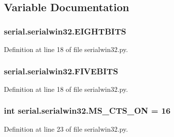 \subsection{Variable Documentation}
\subsubsection[{\texorpdfstring{E\+I\+G\+H\+T\+B\+I\+TS}{EIGHTBITS}}]{\setlength{\rightskip}{0pt plus 5cm}serial.\+serialwin32.\+E\+I\+G\+H\+T\+B\+I\+TS}\hypertarget{namespaceserial_1_1serialwin32_af3a8a7578cf39e9b26901a2341af2ec8}{}\label{namespaceserial_1_1serialwin32_af3a8a7578cf39e9b26901a2341af2ec8}


Definition at line 18 of file serialwin32.\+py.

\subsubsection[{\texorpdfstring{F\+I\+V\+E\+B\+I\+TS}{FIVEBITS}}]{\setlength{\rightskip}{0pt plus 5cm}serial.\+serialwin32.\+F\+I\+V\+E\+B\+I\+TS}\hypertarget{namespaceserial_1_1serialwin32_af6d7987bfd20cc697d5e3e6962be62bd}{}\label{namespaceserial_1_1serialwin32_af6d7987bfd20cc697d5e3e6962be62bd}


Definition at line 18 of file serialwin32.\+py.

\subsubsection[{\texorpdfstring{M\+S\+\_\+\+C\+T\+S\+\_\+\+ON}{MS_CTS_ON}}]{\setlength{\rightskip}{0pt plus 5cm}int serial.\+serialwin32.\+M\+S\+\_\+\+C\+T\+S\+\_\+\+ON = 16}\hypertarget{namespaceserial_1_1serialwin32_a95299fa794686b635febcf3066482fa5}{}\label{namespaceserial_1_1serialwin32_a95299fa794686b635febcf3066482fa5}


Definition at line 23 of file serialwin32.\+py.

